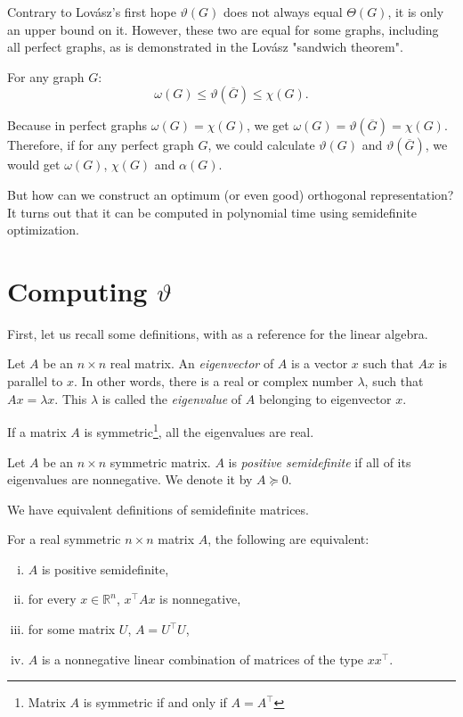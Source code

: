 Contrary to Lovász's first hope \cite{Lovasz1979} $\vartheta(G)$ does not always equal $\Theta(G)$, it is only an upper bound on it. However, these two are equal for some graphs, including all perfect graphs, as is demonstrated in the Lovász "sandwich theorem".

\begin{theorem}
  \label{thm:sandwich}
  For any graph $G$:
  $$ \omega(G) \leq \vartheta(\overline{G}) \leq \chi(G).$$
\end{theorem}

Because in perfect graphs $\omega(G) = \chi(G)$, we get $\omega(G) = \vartheta(\overline{G}) = \chi(G)$. Therefore, if for any perfect graph $G$, we could calculate $\vartheta(G)$ and $\vartheta(\overline{G})$, we would get $\omega(G)$, $\chi(G)$ and $\alpha(G)$.

But how can we construct an optimum (or even good) orthogonal representation? It turns out that it can be computed in polynomial time using semidefinite optimization.

\section{Computing \boldmath$\vartheta$}
\label{sec:computingTheta}

First, let us recall some definitions, with \cite{gilbertstrang2020} as a reference for the linear algebra.

\begin{defn}
  Let $A$ be an $n \times n$ real matrix. An \emph{eigenvector} of $A$ is a vector $x$ such that $Ax$ is parallel to $x$. In other words, there is a real or complex number $\lambda$, such that $Ax = \lambda x$. This $\lambda$ is called the \emph{eigenvalue} of $A$ belonging to eigenvector $x$.
\end{defn}

If a matrix $A$ is symmetric\footnote{Matrix $A$ is symmetric if and only if $A = A^\intercal$}, all the eigenvalues are real.

\begin{defn}
  Let $A$ be an $n \times n$ symmetric matrix. $A$ is \emph{positive semidefinite} if all of its eigenvalues are nonnegative. We denote it by $A \succeq 0$.
\end{defn}

We have equivalent definitions of semidefinite matrices.
\begin{theorem}
  For a real symmetric $n \times n$ matrix $A$, the following are equivalent:
  \begin{enumerate}[(i)]
    \item $A$ is positive semidefinite,
    \item \label{en:ei2} for every $x \in \mathbb{R}^n$, $x^\intercal Ax$ is nonnegative,
    \item for some matrix $U$, $A = U^\intercal U$,
    \item $A$ is a nonnegative linear combination of matrices of the type $xx^\intercal$.
  \end{enumerate}
\end{theorem}

